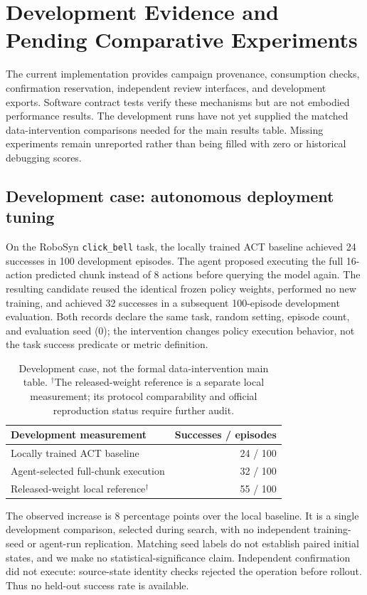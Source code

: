 \documentclass[10pt,twocolumn,letterpaper]{article}
\begin{document}
\section{Development Evidence and Pending Comparative Experiments}
The current implementation provides campaign provenance, consumption checks,
confirmation reservation, independent review interfaces, and development exports.
Software contract tests verify these mechanisms but are not embodied performance
results. The development runs have not yet supplied the matched data-intervention
comparisons needed for the main results table. Missing experiments remain
unreported rather than being filled with zero or historical debugging scores.

\subsection{Development case: autonomous deployment tuning}
On the RoboSyn \texttt{click\_bell} task, the locally trained ACT baseline achieved
24 successes in 100 development episodes. The agent proposed executing the full
16-action predicted chunk instead of 8 actions before querying the model again.
The resulting candidate reused the identical frozen policy weights, performed no
new training, and achieved 32 successes in a subsequent 100-episode development
evaluation. Both records declare the same task, random setting, episode count,
and evaluation seed (0); the intervention changes policy execution behavior,
not the task success predicate or metric definition.

\begin{table}[t]
\centering\small
\begin{tabular}{@{}lr@{}}
\toprule
Development measurement & Successes / episodes \\
\midrule
Locally trained ACT baseline & 24 / 100 \\
Agent-selected full-chunk execution & 32 / 100 \\
Released-weight local reference$^{\dagger}$ & 55 / 100 \\
\bottomrule
\end{tabular}
\caption{Development case, not the formal data-intervention main table.
$^{\dagger}$The released-weight reference is a separate local measurement;
its protocol comparability and official reproduction status require further audit.}
\label{tab:development-case}
\end{table}

The observed increase is 8 percentage points over the local baseline. It is a
single development comparison, selected during search, with no independent
training-seed or agent-run replication. Matching seed labels do not establish
paired initial states, and we make no statistical-significance claim. Independent
confirmation did not execute: source-state identity checks rejected the operation
before rollout. Thus no held-out success rate is available.
\end{document}
